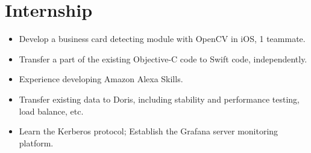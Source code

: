 \documentclass{resume}
\begin{document}
\section{Internship}
\begin{itemize}
  \item Develop a business card detecting module with OpenCV in iOS, 1 teammate.
  \item Transfer a part of the existing Objective-C code to Swift code, independently.
\end{itemize}

\begin{itemize}
  \item Experience developing Amazon Alexa Skills.
\end{itemize}

\begin{itemize}
  \item Transfer existing data to Doris, including stability and performance testing, load balance, etc.
  \item Learn the Kerberos protocol; Establish the Grafana server monitoring platform.
\end{itemize}

\end{document}
